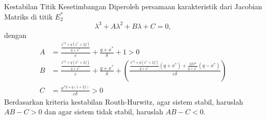\documentclass[aspectratio=169]{beamer}
\begin{document}

\begin{frame}{Kestabilan Titik Kesetimbangan}
    Diperoleh persamaan karakteristik dari Jacobian Matriks di titik $E_2^{*}$
    \begin{equation*}
        \lambda^3 + A\lambda^2 + B\lambda+C=0,
    \end{equation*}
    dengan 
    \begin{align*}
        A &=\tfrac{\tfrac{x^{*2}+q(x^*+2f)}{q+x^*}}{\varepsilon}+\tfrac{q+x^*}{\delta}+1 > 0 \\
        B &=\tfrac{\tfrac{x^{*2}+q(x^*+2f)}{q+x^*}}{\varepsilon}+\tfrac{q+x^*}{\delta}+\left(\tfrac{\tfrac{x^{*2}+q(x^*+2f)}{q+x^*}(q+x^*)+\tfrac{2fx^8}{q+x^*}(q-x^*)}{\varepsilon \delta} \right) \\
        C &=\tfrac{x^{*2+q(1+2f)}}{\varepsilon \delta} > 0
    \end{align*}
    Berdasarkan kriteria kestabilan Routh-Hurwitz, agar sistem stabil, haruslah $AB - C > 0$ dan agar sistem tidak stabil, haruslah $AB - C < 0$.    
\end{frame}
\end{document}
